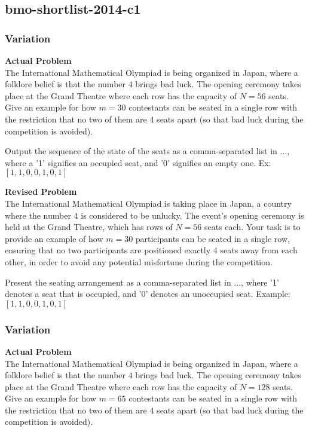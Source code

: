 \subsection{bmo-shortlist-2014-c1}
\subsubsection{Variation}
\textbf{Actual Problem}\\
The International Mathematical Olympiad is being organized in Japan, where a folklore belief is that the number $4$ brings bad luck. The opening ceremony takes place at the Grand Theatre where each row has the capacity of $N=56$ seats. Give an example for how $m = 30$ contestants can be seated in a single row with the restriction that no two of them are $4$ seats apart (so that bad luck during the competition is avoided).

Output the sequence of the state of the seats as a comma-separated list in $\boxed{...}$, where a '1' signifies an occupied seat, and '0' signifies an empty one. Ex: $\boxed{[1,1,0,0,1,0,1]}$

\textbf{Revised Problem}\\
The International Mathematical Olympiad is taking place in Japan, a country where the number $4$ is considered to be unlucky. The event's opening ceremony is held at the Grand Theatre, which has rows of $N=56$ seats each. Your task is to provide an example of how $m = 30$ participants can be seated in a single row, ensuring that no two participants are positioned exactly 4 seats away from each other, in order to avoid any potential misfortune during the competition.

Present the seating arrangement as a comma-separated list in $\boxed{...}$, where '1' denotes a seat that is occupied, and '0' denotes an unoccupied seat. Example: $\boxed{[1,1,0,0,1,0,1]}$

\subsubsection{Variation}
\textbf{Actual Problem}\\
The International Mathematical Olympiad is being organized in Japan, where a folklore belief is that the number $4$ brings bad luck. The opening ceremony takes place at the Grand Theatre where each row has the capacity of $N=128$ seats. Give an example for how $m = 65$ contestants can be seated in a single row with the restriction that no two of them are $4$ seats apart (so that bad luck during the competition is avoided).

